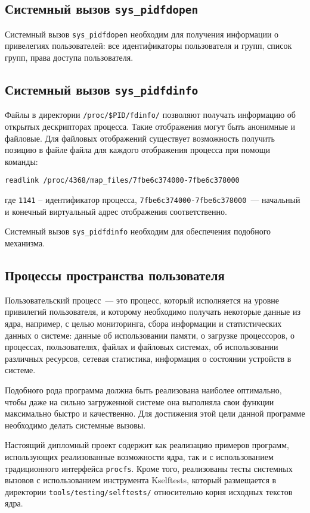 \subsection{Системный вызов \texttt{sys\_pidfdopen}}
\label{sub:sys:sys_pidfdopen}

Системный вызов \texttt{sys\_pidfdopen} необходим для получения информации о
привелегиях пользователей: все идентификаторы пользователя и групп, список
групп, права доступа пользователя.

\subsection{Системный вызов \texttt{sys\_pidfdinfo}}
\label{sub:sys:sys_pidfdinfo}

Файлы в директории \texttt{/proc/\$PID/fdinfo/} позволяют получать информацию
об открытых дескрипторах процесса. Такие отображения могут быть анонимные и
файловые. Для файловых отображений существует возможность получить позицию в
файле файла для каждого отображения процесса при помощи команды: 

\medskip
\begin{lstlisting}[style=cstyle]
 readlink /proc/4368/map_files/7fbe6c374000-7fbe6c378000
\end{lstlisting}
\medskip
где \texttt{1141} -- идентификатор процесса,
\texttt{7fbe6c374000-7fbe6c378000}~--- начальный и конечный виртуальный адрес
отображения соответственно. 

Системный вызов \texttt{sys\_pidfdinfo} необходим для обеспечения подобного
механизма. 

\subsection{Процессы пространства пользователя}
\label{sub:sys:sys_pidfdinfo}

Пользовательский процесс~--- это процесс, который исполняется на уровне
привилегий пользователя, и которому необходимо получать некоторые данные из
ядра, например, с целью мониторинга, сбора информации и статистических данных о
системе: данные об использовании памяти, о загрузке процессоров, о процессах,
пользователях, файлах и файловых системах, об использовании различных ресурсов,
сетевая статистика, информация о состоянии устройств в системе.

Подобного рода программа должна быть реализована наиболее оптимально, чтобы даже
на сильно загруженной системе она выполняла свои функции максимально быстро и
качественно. Для достижения этой цели данной программе необходимо делать
системные вызовы.

Настоящий дипломный проект содержит как реализацию примеров программ,
использующих реализованные возможности ядра, так и с использованием
традиционного интерфейса \texttt{procfs}. Кроме того, реализованы тесты
системных вызовов с использованием инструмента Kselftests, который размещается в
директории \texttt{tools/testing/selftests/} относительно корня исходных текстов
ядра.

